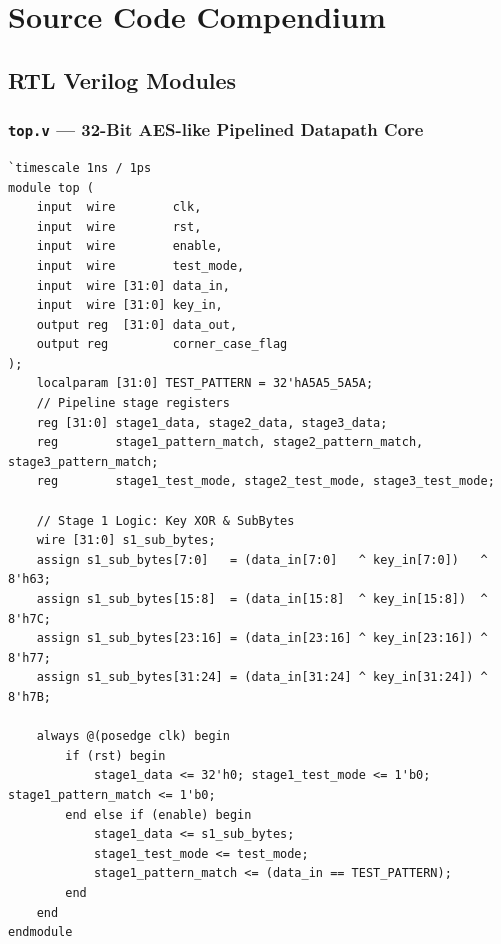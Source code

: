 \documentclass[11pt,a4paper,oneside]{book}
\begin{document}
\appendix
\chapter{Source Code Compendium}

\section{RTL Verilog Modules}

\subsection{\texttt{top.v} --- 32-Bit AES-like Pipelined Datapath Core}
\begin{lstlisting}[language=VerilogCustom]
`timescale 1ns / 1ps
module top (
    input  wire        clk,
    input  wire        rst,
    input  wire        enable,
    input  wire        test_mode,
    input  wire [31:0] data_in,
    input  wire [31:0] key_in,
    output reg  [31:0] data_out,
    output reg         corner_case_flag
);
    localparam [31:0] TEST_PATTERN = 32'hA5A5_5A5A;
    // Pipeline stage registers
    reg [31:0] stage1_data, stage2_data, stage3_data;
    reg        stage1_pattern_match, stage2_pattern_match, stage3_pattern_match;
    reg        stage1_test_mode, stage2_test_mode, stage3_test_mode;

    // Stage 1 Logic: Key XOR & SubBytes
    wire [31:0] s1_sub_bytes;
    assign s1_sub_bytes[7:0]   = (data_in[7:0]   ^ key_in[7:0])   ^ 8'h63;
    assign s1_sub_bytes[15:8]  = (data_in[15:8]  ^ key_in[15:8])  ^ 8'h7C;
    assign s1_sub_bytes[23:16] = (data_in[23:16] ^ key_in[23:16]) ^ 8'h77;
    assign s1_sub_bytes[31:24] = (data_in[31:24] ^ key_in[31:24]) ^ 8'h7B;

    always @(posedge clk) begin
        if (rst) begin
            stage1_data <= 32'h0; stage1_test_mode <= 1'b0; stage1_pattern_match <= 1'b0;
        end else if (enable) begin
            stage1_data <= s1_sub_bytes;
            stage1_test_mode <= test_mode;
            stage1_pattern_match <= (data_in == TEST_PATTERN);
        end
    end
endmodule
\end{lstlisting}
\end{document}
